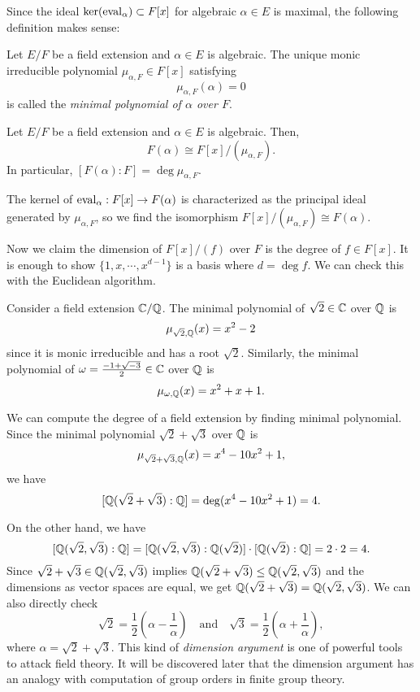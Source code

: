 \documentclass{../note}
\begin{document}
Since the ideal $\ker(\operatorname{eval}_\alpha)\subset F[x]$ for algebraic $\alpha\in E$ is maximal, the following definition makes sense:

\begin{defn}
Let $E/F$ be a field extension and $\alpha\in E$ is algebraic.
The unique monic irreducible polynomial $\mu_{\alpha,F}\in F[x]$ satisfying 
\[\mu_{\alpha,F}(\alpha)=0\]
is called the \emph{minimal polynomial of $\alpha$ over $F$}.
\end{defn}
\begin{thm}
Let $E/F$ be a field extension and $\alpha\in E$ is algebraic.
Then,
\[F(\alpha)\cong F[x]/(\mu_{\alpha,F}).\]
In particular, $[F(\alpha):F]=\deg\mu_{\alpha,F}$.
\end{thm}
\begin{pf}
The kernel of $\operatorname{eval}_\alpha:F[x]\to F(\alpha)$ is characterized as the principal ideal generated by $\mu_{\alpha,F}$, so we find the isomorphism $F[x]/(\mu_{\alpha,F})\cong F(\alpha)$.

Now we claim the dimension of $F[x]/(f)$ over $F$ is the degree of $f\in F[x]$.
It is enough to show $\{1,x,\cdots,x^{d-1}\}$ is a basis where $d=\deg f$.
We can check this with the Euclidean algorithm.
\end{pf}


\begin{ex}
Consider a field extension $\mathbb{C}/\mathbb{Q}$.
The minimal polynomial of $\sqrt2\in\mathbb{C}$ over $\mathbb{Q}$ is
\[\mu_{\sqrt2,\mathbb{Q}}(x)=x^2-2\]
since it is monic irreducible and has a root $\sqrt2$.
Similarly, the minimal polynomial of $\omega=\frac{-1+\sqrt{-3}}2\in\mathbb{C}$ over $\mathbb{Q}$ is
\[\mu_{\omega,\mathbb{Q}}(x)=x^2+x+1.\]
\end{ex}

\begin{ex}
We can compute the degree of a field extension by finding minimal polynomial.
Since the minimal polynomial $\sqrt2+\sqrt3$ over $\mathbb{Q}$ is
\[\mu_{\sqrt2+\sqrt3,\mathbb{Q}}(x)=x^4-10x^2+1,\]
we have
\[[\mathbb{Q}(\sqrt2+\sqrt3):\mathbb{Q}]=\deg(x^4-10x^2+1)=4.\]

On the other hand, we have
\[[\mathbb{Q}(\sqrt2,\sqrt3):\mathbb{Q}]=[\mathbb{Q}(\sqrt2,\sqrt3):\mathbb{Q}(\sqrt2)]\cdot[\mathbb{Q}(\sqrt2):\mathbb{Q}]=2\cdot2=4.\]
Since $\sqrt2+\sqrt3\in\mathbb{Q}(\sqrt2,\sqrt3)$ implies $\mathbb{Q}(\sqrt2+\sqrt3)\le\mathbb{Q}(\sqrt2,\sqrt3)$ and the dimensions as vector spaces are equal, we get $\mathbb{Q}(\sqrt2+\sqrt3)=\mathbb{Q}(\sqrt2,\sqrt3)$.
We can also directly check
\[\sqrt2=\frac12\left(\alpha-\frac1\alpha\right)\quad\text{and}\quad\sqrt3=\frac12\left(\alpha+\frac1\alpha\right),\]
where $\alpha=\sqrt2+\sqrt3$.
This kind of \emph{dimension argument} is one of powerful tools to attack field theory.
It will be discovered later that the dimension argument has an analogy with computation of group orders in finite group theory.
\end{ex}
\end{document}
